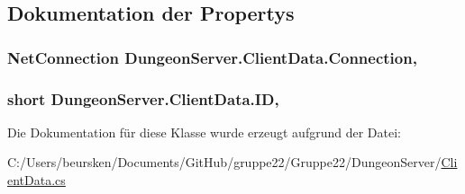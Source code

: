 \subsection{Dokumentation der Propertys}
\hypertarget{class_dungeon_server_1_1_client_data_a643520d4aba602cd2690cd9bd610a073}{
\subsubsection[{Connection}]{\setlength{\rightskip}{0pt plus 5cm}Net\-Connection Dungeon\-Server.\-Client\-Data.\-Connection\hspace{0.3cm}{\ttfamily [get]}, {\ttfamily [set]}}}\label{class_dungeon_server_1_1_client_data_a643520d4aba602cd2690cd9bd610a073}
\hypertarget{class_dungeon_server_1_1_client_data_ac11c0fe5084cdc3d866a036e1258ea67}{
\subsubsection[{I\-D}]{\setlength{\rightskip}{0pt plus 5cm}short Dungeon\-Server.\-Client\-Data.\-I\-D\hspace{0.3cm}{\ttfamily [get]}, {\ttfamily [set]}}}\label{class_dungeon_server_1_1_client_data_ac11c0fe5084cdc3d866a036e1258ea67}


Die Dokumentation für diese Klasse wurde erzeugt aufgrund der Datei\-:\begin{DoxyCompactItemize}
\item 
C\-:/\-Users/beursken/\-Documents/\-Git\-Hub/gruppe22/\-Gruppe22/\-Dungeon\-Server/\hyperlink{_dungeon_server_2_client_data_8cs}{Client\-Data.\-cs}\end{DoxyCompactItemize}
